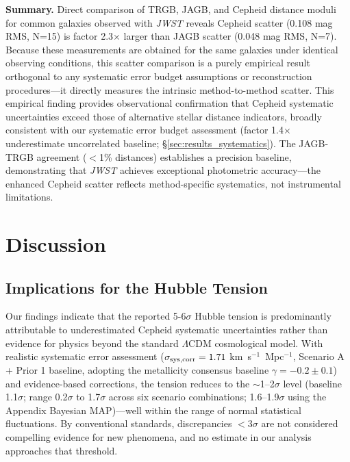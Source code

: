\documentclass[preprint, linenumbers]{aastex701}
\begin{document}
\textbf{Summary.} Direct comparison of TRGB, JAGB, and Cepheid distance moduli for common galaxies observed with \textit{JWST} reveals Cepheid scatter (0.108 mag RMS, N=15) is factor 2.3$\times$ larger than JAGB scatter (0.048 mag RMS, N=7). Because these measurements are obtained for the same galaxies under identical observing conditions, this scatter comparison is a purely empirical result orthogonal to any systematic error budget assumptions or reconstruction procedures---it directly measures the intrinsic method-to-method scatter. This empirical finding provides observational confirmation that Cepheid systematic uncertainties exceed those of alternative stellar distance indicators, broadly consistent with our systematic error budget assessment (factor 1.4$\times$ underestimate uncorrelated baseline; \S\ref{sec:results_systematics}). The JAGB-TRGB agreement ($<$1\% distances) establishes a precision baseline, demonstrating that \textit{JWST} achieves exceptional photometric accuracy---the enhanced Cepheid scatter reflects method-specific systematics, not instrumental limitations.


\section{Discussion} \label{sec:discussion}

\subsection{Implications for the Hubble Tension}

Our findings indicate that the reported 5-6$\sigma$ Hubble tension is predominantly attributable to underestimated Cepheid systematic uncertainties rather than evidence for physics beyond the standard $\Lambda$CDM cosmological model. With realistic systematic error assessment ($\sigma_{\rm sys,corr} = 1.71$ km~s$^{-1}$~Mpc$^{-1}$, Scenario A + Prior 1 baseline, adopting the metallicity consensus baseline $\gamma=-0.2\pm0.1$) and evidence-based corrections, the tension reduces to the $\sim$1--2$\sigma$ level (baseline 1.1$\sigma$; range 0.2$\sigma$ to 1.7$\sigma$ across six scenario combinations; 1.6--1.9$\sigma$ using the Appendix Bayesian MAP)---well within the range of normal statistical fluctuations. By conventional standards, discrepancies $<$3$\sigma$ are not considered compelling evidence for new phenomena, and no estimate in our analysis approaches that threshold.
\end{document}

